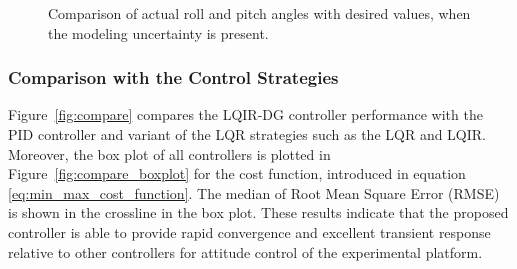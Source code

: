 \documentclass[3p]{elsarticle}
\begin{document}
\begin{figure}[H]
    \caption{Comparison of actual roll and pitch angles with desired values, when the modeling uncertainty is present.}
    \label{fig:weight}
\end{figure}
\subsubsection{Comparison with the Control Strategies}
\noindent Figure~\ref{fig:compare} compares the LQIR-DG controller performance with the PID controller and variant of the LQR strategies such as the LQR and LQIR. 
Moreover, the box plot of all controllers is plotted in Figure~\ref{fig:compare_boxplot} for the cost function, introduced in equation \eqref{eq:min_max_cost_function}. %
The median of Root Mean Square Error (RMSE) is shown in the crossline in the box plot.
These results indicate that the proposed controller is able to provide rapid convergence and excellent transient response relative to other controllers for attitude control of the experimental platform.
\end{document}
